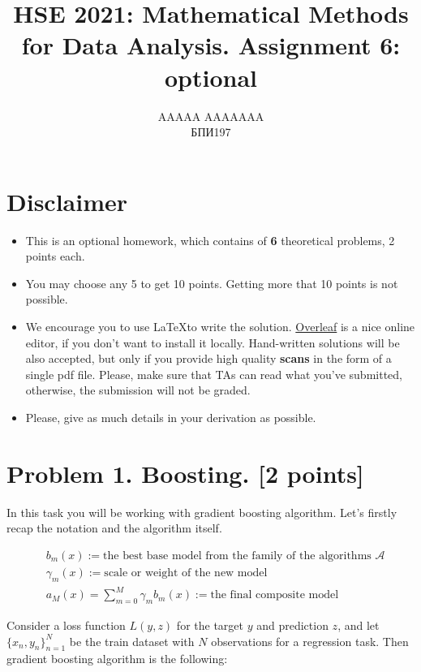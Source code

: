 \documentclass{article}
\title{HSE 2021: Mathematical Methods for Data Analysis. Assignment 6: optional}
\author{AAAAA AAAAAAA \\ БПИ197}
\begin{document}
\maketitle

\section*{Disclaimer}
\begin{itemize}
    \item This is an optional homework, which contains of \textbf{6} theoretical problems, 2 points each.
    \item You may choose any 5 to get 10 points. Getting more that 10 points is not possible.
    \item We encourage you to use \LaTeX to write the solution. \href{https://www.overleaf.com/}{Overleaf} is a nice online editor, if you don't want to install it locally. Hand-written solutions will be also accepted, but only if you provide high quality \textbf{scans} in the form of a single pdf file. Please, make sure that TAs can read what you've submitted, otherwise, the submission will not be graded.
    \item Please, give as much details in your derivation as possible.
\end{itemize}

\newpage
\section*{Problem 1. Boosting. [2 points]}

In this task you will be working with gradient boosting algorithm. Let's firstly recap the notation and the algorithm itself.

\begin{align}
    & b_m(x) := \text{the best base model from the family of the algorithms $\mathcal{A}$} \\
    & \gamma_m(x) := \text{scale or weight of the new model} \\
    & a_M(x) = \sum_{m=0}^M \gamma_m b_m(x) := \text{the final composite model}
\end{align}


Consider a loss function $L(y, z)$ for the target $y$ and prediction $z$, and let
$\{x_n, y_n\}_{n=1}^N$ be the train dataset with $N$ observations for a regression task. Then gradient boosting algorithm is the following:
\end{document}
